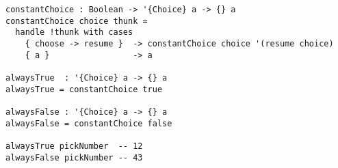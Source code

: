 \begin{algorithm}

\begin{verbatim}
constantChoice : Boolean -> '{Choice} a -> {} a
constantChoice choice thunk =
  handle !thunk with cases
    { choose -> resume }  -> constantChoice choice '(resume choice)
    { a }                 -> a

alwaysTrue  : '{Choice} a -> {} a
alwaysTrue = constantChoice true

alwaysFalse : '{Choice} a -> {} a
alwaysFalse = constantChoice false
    
alwaysTrue pickNumber  -- 12
alwaysFalse pickNumber -- 43
\end{verbatim}

\caption{Effect handlers for Choice that always result in constant value %
\label{alg-eff:choice-constant}}
\end{algorithm}
\endinput
